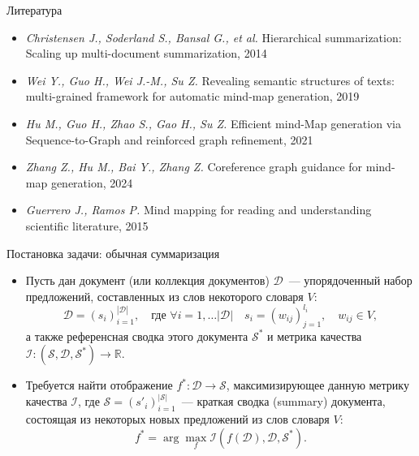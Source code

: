 \documentclass{beamer}
\newcommand{\D}{\mathcal{D}}
\renewcommand{\S}{\mathcal{S}}
\newcommand{\I}{\mathcal{I}}
\newcommand{\R}{\mathbb{R}}
\begin{document}

\begin{frame}{Литература}

\begin{itemize}
    \item \emph{Christensen J., Soderland S., Bansal G., et al.} Hierarchical summarization: Scaling up multi-document summarization, 2014

    \item \emph{Wei Y., Guo H., Wei J.-M., Su Z.} Revealing semantic structures of texts: multi-grained framework for automatic mind-map generation, 2019

    \item \emph{Hu M., Guo H., Zhao S., Gao H., Su Z.} Efficient mind-Map generation via Sequence-to-Graph and reinforced graph refinement, 2021

    \item \emph{Zhang Z., Hu M., Bai Y., Zhang Z.} Coreference graph guidance for mind-map generation, 2024
    
    \item \emph{Guerrero J., Ramos P.} Mind mapping for reading and understanding scientific literature, 2015
\end{itemize}
    
\end{frame}


\begin{frame}{Постановка задачи: обычная суммаризация}

\begin{itemize}
    \item Пусть дан документ (или коллекция документов) $\D$~--- упорядоченный набор предложений, составленных из слов некоторого словаря $V$: 
    $$
    \D = \left(s_i\right)_{i=1}^{|\D|},\quad \text{где } \forall i=1,\dots |\D|\quad s_i = \left(w_{ij}\right)_{j=1}^{l_i}, \quad w_{ij}\in V,
    $$
    а также референсная сводка этого документа $\S^*$ и метрика качества $\I: (\S, \D, \S^*) \rightarrow \R$.
    \item Требуется найти отображение $f^*: \D \rightarrow \S$, максимизирующее данную метрику качества $\I$, где $\S = \left(s'_i\right)_{i=1}^{|\S|}$~--- краткая сводка (summary) документа, состоящая из некоторых новых предложений из слов словаря $V$:
    $$
    f^* = \arg\max\limits_{f} \I(f(\D), \D, \S^*).
    $$
\end{itemize}

\end{frame}
\end{document}
